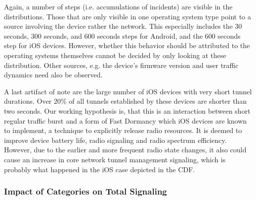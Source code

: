 Again, a number of steps (i.e. accumulations of incidents) are visible in the distributions. Those that are only visible in one operating system type point to a source involving the device rather the network. This especially includes the 30 seconds, 300 seconds, and 600 seconds steps for Android, and the 600 seconds step for iOS devices. However, whether this behavior should be attributed to the operating systems themselves cannot be decided by only looking at these distribution. Other sources, e.g. the device's firmware version and user traffic dynamics need also be observed.

A last artifact of note are the large number of iOS devices with very short tunnel durations. Over 20\% of all tunnels established by these devices are shorter than two seconds. Our working hypothesis is, that this is an interaction between short regular traffic burst and a form of Fast Dormancy \cite{gsma2011fdbestpract} which iOS devices are known to implement, a technique to explicitly release radio resources. It is deemed to improve device battery life, radio signaling and radio spectrum efficiency. However, due to the earlier and more frequent radio state changes, it also could cause an increase in core network tunnel management signaling, which is probably what happened in the iOS case depicted in the CDF.



\subsubsection{Impact of Categories on Total Signaling}


